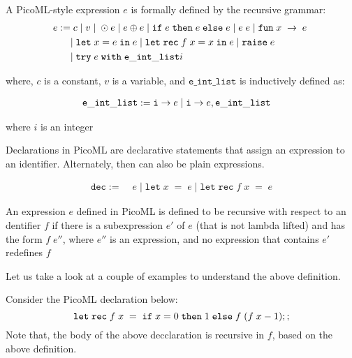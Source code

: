 \begin{definition}
A PicoML-style expression $e$ is formally defined by the recursive grammar:
\begin{equation*}
\begin{split}
e :=& \; c \; | \; v \; | \; \odot e \; | \; e \oplus e \; | \; \ifexp{e}{e}{e} \; | \; e \; e \; | \; \funexp{x}{e} \; \\
  &| \; \letinexp{x}{e}{e} \; | \; \letrecinexp{f}{x}{e}{e}  \; | \; \raiseexp{e} \;\\
  &| \; \mathtt{try} \; e \; \mathtt{with} \; \mathtt{e\_int\_list}
i\end{split}
\end{equation*}

where, $c$ is a constant, $v$ is a variable, and $\mathtt{e\_int\_list}$ is inductively defined as:

\begin{equation*}
\begin{split}
\mathtt{e\_int\_list} :=& \; \mathtt{i} \arr e  \; | \; \mathtt{i} \arr e , \mathtt{e\_int\_list}
\end{split}
\end{equation*}

where $i$ is an integer
\end{definition}

\begin{definition}
Declarations in PicoML are declarative statements that assign an expression to an identifier. Alternately, then can also be plain expressions.

\begin{equation*}
\begin{split}
\mathtt{dec} :=& \; e  \; | \; \mathtt{let} \; x \; \mathtt{=} \; e \; | \; \mathtt{let} \; \mathtt{rec} \; f \; x \; \mathtt{=} \; e
\end{split}
\end{equation*}
\end{definition}


\begin{definition}
An expression $e$ defined in PicoML is defined to be recursive with respect to an dentifier $f$ if 
there is a subexpression $e'$ of $e$ (that is not lambda lifted) and has the form $f \; e''$, where $e''$ is an expression, 
and no expression that contains $e'$ redefines $f$
\end{definition}

Let us take a look at a couple of examples to understand the above definition.
\begin{example}
Consider the PicoML declaration below:
\[
\mathtt{let} \; \mathtt{rec} \; f \; x \; = \; \ifexp{x = 0}{1}{f \; (f \; x - 1)} ;;
\]
Note that, the body of the above decclaration is recursive in $f$, based on the above definition.
 \end{example} 

